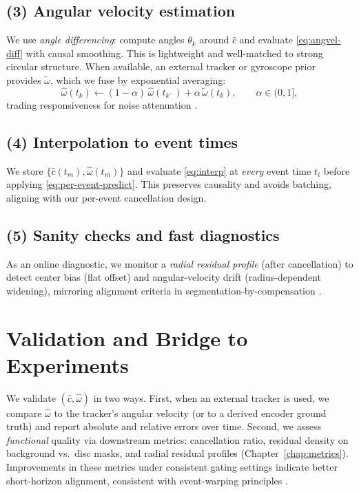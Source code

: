 \subsection*{(3) Angular velocity estimation}
We use \emph{angle differencing}: compute angles $\theta_k$ around $\hat c$ and evaluate \eqref{eq:angvel-diff} with causal smoothing. This is lightweight and well-matched to strong circular structure.
When available, an external tracker or gyroscope prior provides $\tilde\omega$, which we fuse by exponential averaging:
\begin{equation}
\hat\omega(t_k) \leftarrow (1-\alpha)\,\hat\omega(t_{k^-}) + \alpha\,\tilde\omega(t_k),\qquad \alpha\in(0,1],
\label{eq:ema}
\end{equation}
trading responsiveness for noise attenuation \cite{Rebecq2017EVO}.

\subsection*{(4) Interpolation to event times}
We store $\{\hat c(t_m),\hat\omega(t_m)\}$ and evaluate \eqref{eq:interp} at \emph{every} event time $t_i$ before applying \eqref{eq:per-event-predict}. This preserves causality and avoids batching, aligning with our per-event cancellation design.

\subsection*{(5) Sanity checks and fast diagnostics}
As an online diagnostic, we monitor a \emph{radial residual profile} (after cancellation) to detect center bias (flat offset) and angular-velocity drift (radius-dependent widening), mirroring alignment criteria in segmentation-by-compensation \cite{Stoffregen2019Segmentation}.

\section{Validation and Bridge to Experiments}
We validate $(\hat c,\hat\omega)$ in two ways. First, when an external tracker is used, we compare $\hat\omega$ to the tracker's angular velocity (or to a derived encoder ground truth) and report absolute and relative errors over time. Second, we assess \emph{functional} quality via downstream metrics: cancellation ratio, residual density on background vs.\ disc masks, and radial residual profiles (Chapter~\ref{chap:metrics}). Improvements in these metrics under consistent gating settings indicate better short-horizon alignment, consistent with event-warping principles \cite{Gallego2018CMax}.

